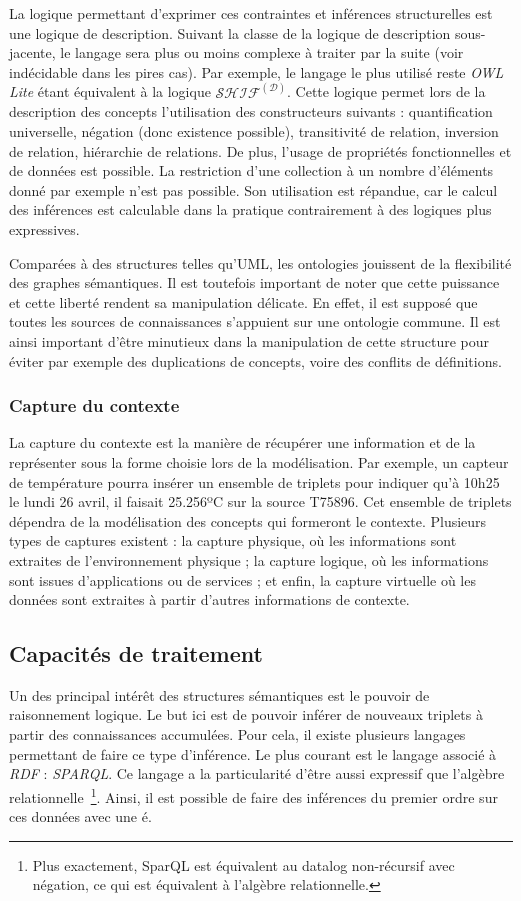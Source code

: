 La logique permettant d'exprimer ces contraintes et inférences structurelles est une logique de description. Suivant la classe de la logique de description sous-jacente, le langage sera plus ou moins complexe à traiter par la suite (voir indécidable dans les pires cas). Par exemple, le langage le plus utilisé reste \textit{OWL Lite} étant équivalent à la logique $\mathcal{SHIF}^\mathcal{(D)}$. Cette logique permet lors de la description des concepts l'utilisation des constructeurs suivants : quantification universelle, négation (donc existence possible), transitivité de relation, inversion de relation, hiérarchie de relations. De plus, l'usage de propriétés fonctionnelles et de données est possible. La restriction d'une collection à un nombre d'éléments donné par exemple n'est pas possible. Son utilisation est répandue, car le calcul des inférences est calculable dans la pratique contrairement à des logiques plus expressives.

Comparées à des structures telles qu'UML, les ontologies jouissent de la flexibilité des graphes sémantiques. Il est toutefois important de noter que cette puissance et cette liberté rendent sa manipulation délicate. En effet, il est supposé que toutes les sources de connaissances s'appuient sur une ontologie commune. Il est ainsi important d'être minutieux dans la manipulation de cette structure pour éviter par exemple des duplications de concepts, voire des conflits de définitions.

\subsubsection{Capture du contexte}
La capture du contexte est la manière de récupérer une information et de la représenter sous la forme choisie lors de la modélisation. Par exemple, un capteur de température pourra insérer un ensemble de triplets pour indiquer qu'à 10h25 le lundi 26 avril, il faisait 25.256ºC sur la source T75896. Cet ensemble de triplets dépendra de la modélisation des concepts qui formeront le contexte. Plusieurs types de captures existent : la capture physique, où les informations sont extraites de l'environnement physique ; la capture logique, où les informations sont issues d'applications ou de services ; et enfin, la capture virtuelle où les données sont extraites à partir d'autres informations de contexte.

\subsection{Capacités de traitement}
Un des principal intérêt des structures sémantiques est le pouvoir de raisonnement logique. Le but ici est de pouvoir inférer de nouveaux triplets à partir des connaissances accumulées. Pour cela, il existe plusieurs langages permettant de faire ce type d'inférence. Le plus courant est le langage associé à \textit{RDF} : \textit{SPARQL}. Ce langage a la particularité d'être aussi expressif que l'algèbre relationnelle~\cite{Angles:sparql}\footnote{Plus exactement, SparQL est équivalent au datalog non-récursif avec négation, ce qui est équivalent à l'algèbre relationnelle.}. Ainsi, il est possible de faire des inférences du premier ordre sur ces données avec une é.

